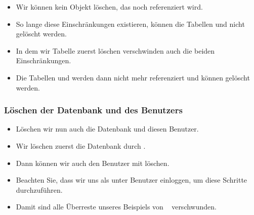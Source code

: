 \documentclass[aspectratio=169,mathserif,notheorems]{beamer}%
\begin{document}
\begin{frame}[t]
{{\begin{itemize}
{}%
%
%
%
\item<18-> Wir können kein Objekt löschen, das noch referenziert wird.%
%
\item<19-> So lange diese Einschränkungen existieren, können die Tabellen  und  nicht gelöscht werden.%
%
\item<20-> In dem wir Tabelle  zuerst löschen verschwinden auch die beiden Einschränkungen.%
%
\item<21-> Die Tabellen  und  werden dann nicht mehr referenziert und können gelöscht werden.%
\end{itemize}%
}}%
%
%
%
%
\end{frame}%
%
\begin{frame}[t]%
\frametitle{Löschen der Datenbank und des Benutzers}%
%
\parbox{0.4\paperwidth}{\small{%
\begin{itemize}%
%
%
%
\item<2-> Löschen wir nun auch die Datenbank und diesen Benutzer.%
%
\item<3-> Wir löschen zuerst die Datenbank durch \cite{PGDG:PD:DD}.%
%
\item<4-> Dann können wir auch den Benutzer mit  löschen\cite{PGDG:PD:DU}.%
%
\item<5-> Beachten Sie, dass wir uns als  unter Benutzer  einloggen, um diese Schritte durchzuführen.%
%
\item<6-> Damit sind alle Überreste unseres Beispiels von \dbms\  verschwunden.%
\end{itemize}%
}}%
%
%
%
%
\end{frame}%
%
\end{document}
